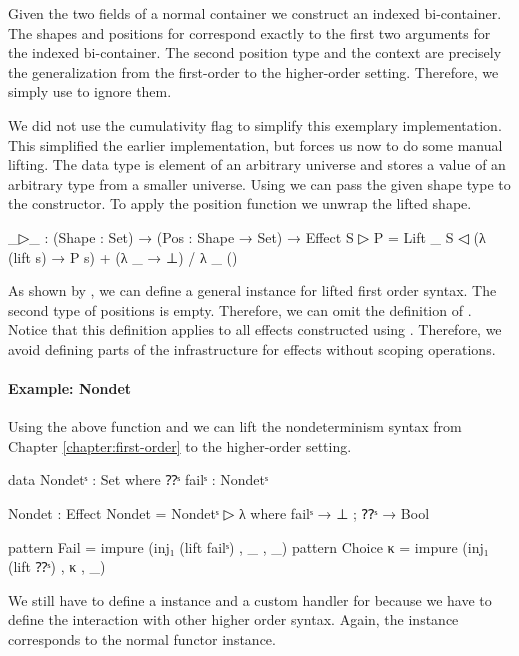 Given the two fields of a normal container we construct an indexed bi-container.
The shapes and positions for  correspond exactly to the first
two arguments for the indexed bi-container.
The second position type and the context are precisely the generalization from
the first-order to the higher-order setting.
Therefore, we simply use  to ignore them.

We did not use the cumulativity flag to simplify this exemplary implementation.
This simplified the earlier implementation, but forces us now to do some manual
lifting.
The  data type is element of an arbitrary universe and stores
a value of an arbitrary type from a smaller universe.
Using  we can pass the given shape type to the constructor.
To apply the position function we unwrap the lifted shape.

\begin{code}
_▷_ : (Shape : Set) → (Pos : Shape → Set) → Effect
S ▷ P = Lift _ S ◁ (λ (lift s) → P s) + (λ _ → ⊥) / λ _ ()
\end{code}
As shown by \textcite{DBLP:conf/haskell/WuSH14}, we can define a general
 instance for lifted first order syntax.
The second type of positions is empty.
Therefore, we can omit the definition of .
Notice that this definition applies to all effects constructed using
.
Therefore, we avoid defining parts of the infrastructure for effects without
scoping operations.


\paragraph{Example: Nondet}
Using the above function and  we can lift the
nondeterminism syntax from Chapter \ref{chapter:first-order} to the higher-order
setting.

\begin{code}[hide]
data Nondetˢ : Set where ⁇ˢ failˢ : Nondetˢ
\end{code}
\begin{code}
Nondet : Effect
Nondet = Nondetˢ ▷ λ where failˢ → ⊥ ; ⁇ˢ → Bool

pattern Fail      = impure (inj₁ (lift failˢ)  , _ , _)
pattern Choice κ  = impure (inj₁ (lift ⁇ˢ)     , κ , _)
\end{code}
We still have to define a  instance and a custom handler
for  because we have to define the interaction with other
higher order syntax.
Again, the  instance corresponds to the normal functor
instance.

